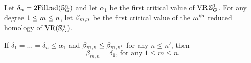 \subsubsection{}
\label{subsub:foundamental_bar_rpn_lemma}

Let $\delta_n=2\mathrm{Fillrad}(\mathbb{S}^n_G)$ and 
let $\alpha_1$ be the first critical value of $\operatorname{VR}\mathbb{S}^1_G$.
For any degree $1 \leq m \leq n$, let $\beta_{m, n}$ be the first critical value of the $m^{\mathrm{th}}$ reduced homology of $\operatorname{VR}(\mathbb{S}^n_G)$. 

\medskip\lemma
If $\delta_1 = \dots = \delta_n \leq \alpha_1$ and $\beta_{m, n} \leq \beta_{m, n'}$ for any $n\leq n'$, then
\[
\beta_{m, n} = \delta_1, \, \text{for any $1 \leq m \leq n$.}
\]


